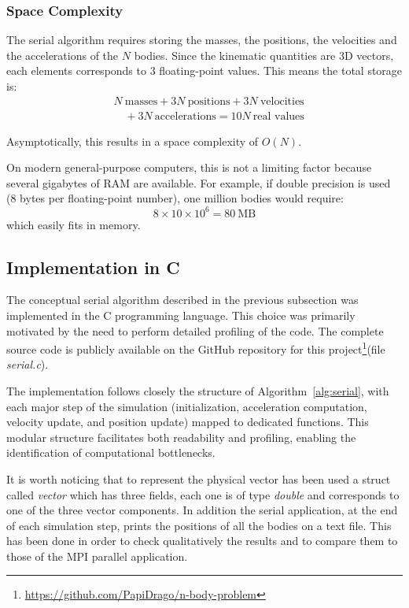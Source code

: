 \documentclass{article}
\begin{document}
\subsubsection{Space Complexity}
The serial algorithm requires storing the masses, the positions, the velocities and the accelerations of the $N$ bodies. Since the kinematic quantities are 3D vectors, each elements corresponds to 3 floating-point values.
This means the total storage is: %
\begin{align*}
&N \ \text{masses} + 3N \ \text{positions} + 3N \ \text{velocities} \\
&\quad + 3N \ \text{accelerations} = 10N \ \text{real values}
\end{align*}

Asymptotically, this results in a space complexity of $O(N)$.  

On modern general-purpose computers, this is not a limiting factor because several gigabytes of RAM are available. For example, if double precision is used (8 bytes per floating-point number), one million bodies would require:
\[
8 \times 10 \times 10^6 = 80 \ \text{MB}
\]
which easily fits in memory.

\subsection{Implementation in C}
\label{subsec:c_impl}
The conceptual serial algorithm described in the previous subsection was implemented in the C programming language. This choice was primarily motivated by the need to perform detailed profiling of the code. The complete source code is publicly available on the GitHub repository for this project\footnote{\url{https://github.com/PapiDrago/n-body-problem}\label{fn:repo}}(file \emph{serial.c}).

The implementation follows closely the structure of Algorithm~\ref{alg:serial}, with each major step of the simulation (initialization, acceleration computation, velocity update, and position update) mapped to dedicated functions.
This modular structure facilitates both readability and profiling, enabling the identification of computational bottlenecks.  

It is worth noticing that to represent the physical vector has been used a struct called \emph{vector} which has three fields, each one is of type \emph{double} and corresponds to one of the three vector components.
In addition the serial application, at the end of each simulation step, prints the positions of all the bodies on a text file. This has been done in order to check qualitatively the results and to compare them to those of the MPI parallel application.
\end{document}
